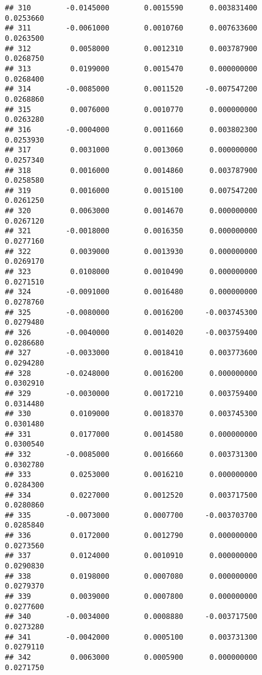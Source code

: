 \documentclass[
]{article}
\begin{document}
\begin{verbatim}
## 310        -0.0145000        0.0015590      0.003831400             0.0253660
## 311        -0.0061000        0.0010760      0.007633600             0.0263500
## 312         0.0058000        0.0012310      0.003787900             0.0268750
## 313         0.0199000        0.0015470      0.000000000             0.0268400
## 314        -0.0085000        0.0011520     -0.007547200             0.0268860
## 315         0.0076000        0.0010770      0.000000000             0.0263280
## 316        -0.0004000        0.0011660      0.003802300             0.0253930
## 317         0.0031000        0.0013060      0.000000000             0.0257340
## 318         0.0016000        0.0014860      0.003787900             0.0258580
## 319         0.0016000        0.0015100      0.007547200             0.0261250
## 320         0.0063000        0.0014670      0.000000000             0.0267120
## 321        -0.0018000        0.0016350      0.000000000             0.0277160
## 322         0.0039000        0.0013930      0.000000000             0.0269170
## 323         0.0108000        0.0010490      0.000000000             0.0271510
## 324        -0.0091000        0.0016480      0.000000000             0.0278760
## 325        -0.0080000        0.0016200     -0.003745300             0.0279480
## 326        -0.0040000        0.0014020     -0.003759400             0.0286680
## 327        -0.0033000        0.0018410      0.003773600             0.0294280
## 328        -0.0248000        0.0016200      0.000000000             0.0302910
## 329        -0.0030000        0.0017210      0.003759400             0.0314480
## 330         0.0109000        0.0018370      0.003745300             0.0301480
## 331         0.0177000        0.0014580      0.000000000             0.0300540
## 332        -0.0085000        0.0016660      0.003731300             0.0302780
## 333         0.0253000        0.0016210      0.000000000             0.0284300
## 334         0.0227000        0.0012520      0.003717500             0.0280860
## 335        -0.0073000        0.0007700     -0.003703700             0.0285840
## 336         0.0172000        0.0012790      0.000000000             0.0273560
## 337         0.0124000        0.0010910      0.000000000             0.0290830
## 338         0.0198000        0.0007080      0.000000000             0.0279370
## 339         0.0039000        0.0007800      0.000000000             0.0277600
## 340        -0.0034000        0.0008880     -0.003717500             0.0273280
## 341        -0.0042000        0.0005100      0.003731300             0.0279110
## 342         0.0063000        0.0005900      0.000000000             0.0271750

\end{verbatim}
\end{document}
